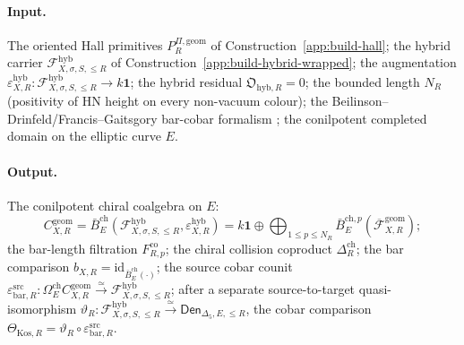 \paragraph{Input.}
The oriented Hall primitives
\(P_R^{\Pi,\mathrm{geom}}\) of
Construction~\ref{app:build-hall}; the hybrid carrier
\(\mathcal F_{X,\sigma,S,\le R}^{\mathrm{hyb}}\) of
Construction~\ref{app:build-hybrid-wrapped}; the augmentation
\(\varepsilon_{X,R}^{\mathrm{hyb}}:
\mathcal F_{X,\sigma,S,\le R}^{\mathrm{hyb}}\to k\mathbf 1\); the
hybrid residual \(\mathfrak O_{\mathrm{hyb},R}=0\); the bounded
length \(N_R\) (positivity of HN height on every non-vacuum colour);
the Beilinson--Drinfeld/Francis--Gaitsgory bar-cobar formalism
\cite{BD,FrancisGaitsgoryCKD}; the conilpotent completed domain on
the elliptic curve \(E\).

\paragraph{Output.}
The conilpotent chiral coalgebra on \(E\):
\[
C_{X,R}^{\mathrm{geom}}
=\bar B_E^{\mathrm{ch}}
(\mathcal F_{X,\sigma,S,\le R}^{\mathrm{hyb}},
\varepsilon_{X,R}^{\mathrm{hyb}})
=k\mathbf 1\oplus\bigoplus_{1\le p\le N_R}
\bar B_E^{\mathrm{ch},p}(\overline{\mathcal F}_{X,R}^{\mathrm{geom}});
\]
the bar-length filtration
\(F^{\mathrm{co}}_{R,p}\); the chiral collision coproduct
\(\Delta_R^{\mathrm{ch}}\); the bar comparison
\(b_{X,R}=\mathrm{id}_{\bar B_E^{\mathrm{ch}}(\cdot)}\); the source
cobar counit
\(\varepsilon^{\mathrm{src}}_{\mathrm{bar},R}:
\Omega_E^{\mathrm{ch}}C_{X,R}^{\mathrm{geom}}
\xrightarrow{\simeq}
\mathcal F_{X,\sigma,S,\le R}^{\mathrm{hyb}}\); after a separate
source-to-target quasi-isomorphism
\(\vartheta_R:\mathcal F_{X,\sigma,S,\le R}^{\mathrm{hyb}}
\xrightarrow{\simeq}\mathsf{Den}_{\Delta_5,E,\le R}\), the cobar
comparison
\(\Theta_{\mathrm{Kos},R}=\vartheta_R\circ\varepsilon^{\mathrm{src}}_{\mathrm{bar},R}\).

